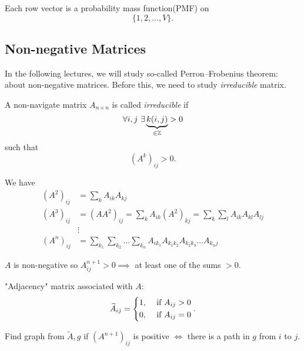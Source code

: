 \begin{property}
	Each row vector is a probability mass function(PMF) on
	\[
		\{1, 2, \ldots , V\}.
	\]
\end{property}

\subsection{Non-negative Matrices}
In the following lectures, we will study so-called Perron–Frobenius theorem: about non-negative matrices. Before this, we need to study
\emph{irreducible} matrix.

\begin{definition}
	A non-navigate matrix \(A_{n\times n}\) is called \emph{irreducible} if
	\[
		\forall i, j\ \exists \underbrace{k(i, j)}_{\in\mathbb{\MakeUppercase{Z}}}>0
	\]
	such that
	\[
		(A^k)_{ij}>0.
	\]
\end{definition}

We have
\[
	\begin{split}
		(A^2)_{ij} &= \sum\limits_{k} A_{ik}A_{kj}\\
		(A^3)_{ij} &= (A A^2)_{ij} = \sum\limits_{k} A_{ik}(A^2)_{kj} = \sum\limits_{k}\sum\limits_{l} A_{ik} A_{kl}A_{lj}\\
		&\vdots\\
		(A^n)_{ij} &= \sum\limits_{k_1}\sum\limits_{k_2}\ldots \sum\limits_{k_n}A_{ik_1}A_{k_1 k_2}A_{k_2 k_3}\ldots A_{k_n j}
	\end{split}
\]

\(A\) is non-negative so \(A^{n+1}_{ij} > 0\implies \) at least one of the sums \(>0\).

"Adjacency" matrix associated with \(A\):
\[
	\widetilde{A}_{ij} = \begin{dcases}
		1, & \text{ if }A_{ij}>0 \\
		0, & \text{ if }A_{ij}=0 \\
	\end{dcases}.
\]

Find graph from \(\widetilde{A}, g\) if \((A^{n+1})_{ij}\) is positive \(\iff\) there is a path in \(g\) from
\(i\) to \(j\).